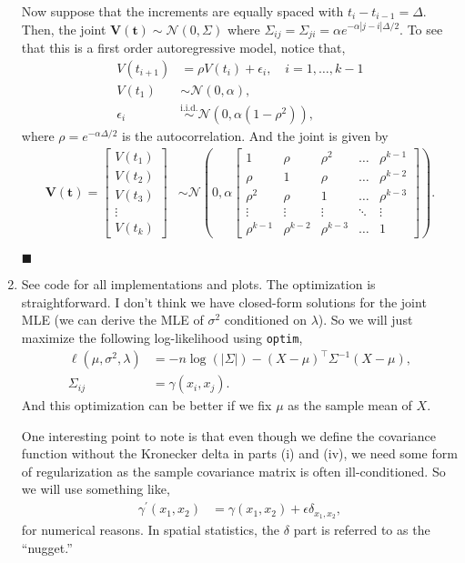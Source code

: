 \documentclass[11pt]{article}
\newcommand{\abs}[1]{\left\lvert#1\right\rvert}
\begin{document}
\begin{enumerate}
Now suppose that the increments are equally spaced with $t_{i} - t_{i-1} = \Delta$. Then, the joint $\mathbf{V}(\mathbf{t}) \sim \mathcal{N}(0, \Sigma)$ where $\Sigma_{ij} = \Sigma_{ji} = \alpha e^{- \alpha \abs{j-i} \Delta / 2}$. To see that this is a first order autoregressive model, notice that,
\begin{align*}
	V(t_{i+1}) &= \rho V(t_{i}) + \epsilon_i, \quad i = 1, \dots, k-1 \\
	V(t_1) &\sim \mathcal{N}(0, \alpha), \\
	\epsilon_i &\stackrel{\text{i.i.d.}}{\sim} \mathcal{N}\left( 0, \alpha(1 - \rho^2) \right),
\end{align*}
where $\rho = e^{-\alpha \Delta / 2}$ is the autocorrelation. And the joint is given by
\begin{align*}
	\mathbf{V}(\mathbf{t}) = \begin{bmatrix}
	V(t_1) \\
	V(t_2) \\
	V(t_3) \\
	\vdots \\
	V(t_k)
	\end{bmatrix} &\sim \mathcal{N} \left(0, \alpha \begin{bmatrix}
	1 & \rho & \rho^2 & \dots & \rho^{k-1} \\
	\rho & 1 & \rho & \dots & \rho^{k-2} \\
	\rho^2 & \rho & 1 & \dots & \rho^{k-3} \\
	\vdots & \vdots & \vdots & \ddots & \vdots \\
	\rho^{k-1} & \rho^{k-2} & \rho^{k-3} & \dots & 1
	\end{bmatrix} \right).
\end{align*}

\hfill $\blacksquare$

\clearpage

\item See code for all implementations and plots. The optimization is straightforward. I don't think we have closed-form solutions for the joint MLE (we can derive the MLE of $\sigma^2$ conditioned on $\lambda$). So we will just maximize the following log-likelihood using \texttt{optim},
\begin{align*}
	\ell(\mu, \sigma^2, \lambda) &= - n \log(\abs{\Sigma}) - (X - \mu)^{\top} \Sigma^{-1} (X - \mu), \\
	\Sigma_{ij} &= \gamma(x_i, x_j).
\end{align*}
And this optimization can be better if we fix $\mu$ as the sample mean of $X$.


One interesting point to note is that even though we define the covariance function without the Kronecker delta in parts (i) and (iv), we need some form of regularization as the sample covariance matrix is often ill-conditioned. So we will use something like,
\begin{align*}
	\gamma^{\prime}(x_1, x_2) &= \gamma(x_1, x_2) + \epsilon \delta_{x_1, x_2},
\end{align*}
for numerical reasons. In spatial statistics, the $\delta$ part is referred to as the ``nugget.''


\end{enumerate}
\end{document}
